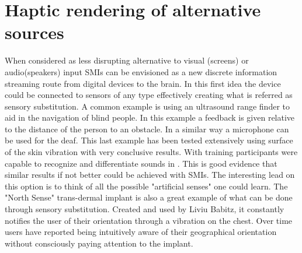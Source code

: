 \documentclass[10pt,journal,compsoc]{IEEEtran}
\begin{document}
\section{Haptic rendering of alternative sources}
	When considered as less disrupting alternative to visual (screens) or audio(speakers) input SMIs can be envisioned as a new discrete information streaming route from digital devices to the brain. 
	In this first idea the device could be connected to sensors of any type effectively creating what is referred as sensory substitution. A common example is using an ultrasound range finder to aid in the navigation of blind people. In this example a feedback is given relative to the distance of the person to an obstacle. In a similar way a microphone can be used for the deaf. 
	This last example has been tested extensively using surface of the skin vibration with very conclusive results. With training participants were capable to recognize and differentiate sounds in \cite{perrotta2021neuroscience}. This is good evidence that similar results if not better could be achieved with SMIs. The interesting lead on this option is to think of all the possible "artificial senses" one could learn. The "North Sense" trans-dermal implant is also a great example of what can be done through sensory substitution. Created and used by Liviu Babitz, it constantly notifies the user of their orientation through a vibration on the chest. Over time users have reported being intuitively aware of their geographical orientation without consciously paying attention to the implant.
	
\end{document}
